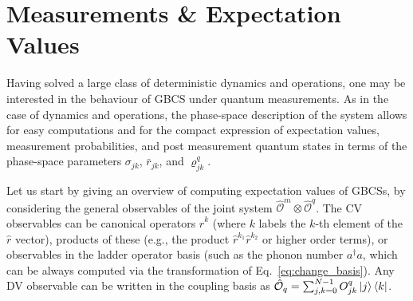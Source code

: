 \documentclass[%
reprint,
superscriptaddress,
nofootinbib,
 amsmath,amssymb,
prx,
floatfix,
]{revtex4-2}
\begin{document}
\section{Measurements \& Expectation Values \label{sec:measure}}

Having solved a large class of deterministic dynamics and operations, one may be interested in the behaviour of GBCS under quantum measurements. As in the case of dynamics and operations, the phase-space description of the system allows for easy computations and for the compact expression of expectation values, measurement probabilities, and post measurement quantum states in terms of the phase-space parameters $\sigma_{jk}$, $\bar{r}_{jk}$, and $\varrho_{jk}^q$. 

Let us start by giving an overview of computing expectation values of GBCSs, by considering the general observables of the joint system $  \hat{\mathcal{O}}^m\otimes\hat{\mathcal{O}}^q$. The CV observables can be canonical operators $\hat{r}^k$ (where $k$ labels the $k$-th element of the $\hat{r}$ vector), products of these (e.g., the product $\hat{r}^{k_1} \hat{r}^{k_2}$ or higher order terms), or observables in the ladder operator basis (such as the phonon number $a^\dag a$, which can be always computed via the transformation of Eq.~\ref{eq:change_basis}). Any DV observable can be written in the coupling basis as $\hat{\mathcal{O}}_q = \sum_{j, k  = 0}^{N-1} O^{q}_{jk} \ket{j} \bra{k}$. 
\end{document}
